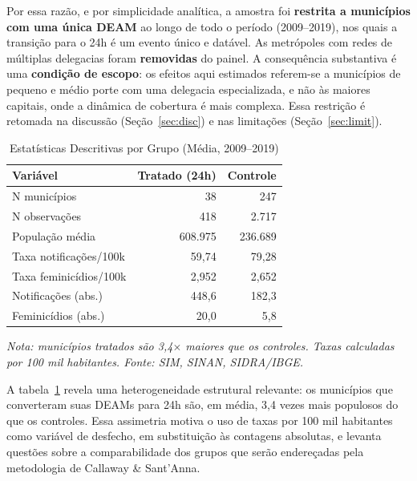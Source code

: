 \documentclass[twocolumn, 10pt]{article}
\begin{document}
Por essa razão, e por simplicidade analítica, a amostra foi \textbf{restrita a
municípios com uma única DEAM} ao longo de todo o período (2009--2019), nos
quais a transição para o 24h é um evento único e datável. As metrópoles com
redes de múltiplas delegacias foram \textbf{removidas} do painel. A consequência
substantiva é uma \textbf{condição de escopo}: os efeitos aqui estimados
referem-se a municípios de pequeno e médio porte com uma delegacia
especializada, e não às maiores capitais, onde a dinâmica de cobertura é mais
complexa. Essa restrição é retomada na discussão (Seção~\ref{sec:disc}) e nas
limitações (Seção~\ref{sec:limit}).

\begin{table}[H]
\centering
\caption{Estatísticas Descritivas por Grupo (Média, 2009--2019)}
\label{tab:descritivas}
\small
\begin{tabularx}{\columnwidth}{@{}Xrr@{}}
\toprule
\textbf{Variável} & \textbf{Tratado (24h)} & \textbf{Controle} \\
\midrule
N municípios            & 38        & 247      \\
N observações           & 418       & 2.717    \\
População média         & 608.975   & 236.689  \\
Taxa notificações/100k  & 59,74     & 79,28    \\
Taxa feminicídios/100k  & 2,952     & 2,652    \\
Notificações (abs.)     & 448,6     & 182,3    \\
Feminicídios (abs.)     & 20,0      & 5,8      \\
\bottomrule
\end{tabularx}
\smallskip\par
{\footnotesize\sffamily\itshape
Nota: municípios tratados são 3,4$\times$ maiores que os controles.
Taxas calculadas por 100 mil habitantes. Fonte: SIM, SINAN, SIDRA/IBGE.}
\end{table}

A tabela~\ref{tab:descritivas} revela uma heterogeneidade estrutural relevante:
os municípios que converteram suas DEAMs para 24h são, em média, 3,4 vezes mais
populosos do que os controles. Essa assimetria motiva o uso de taxas por 100 mil
habitantes como variável de desfecho, em substituição às contagens absolutas, e
levanta questões sobre a comparabilidade dos grupos que serão endereçadas pela
metodologia de Callaway \& Sant'Anna.
\end{document}
